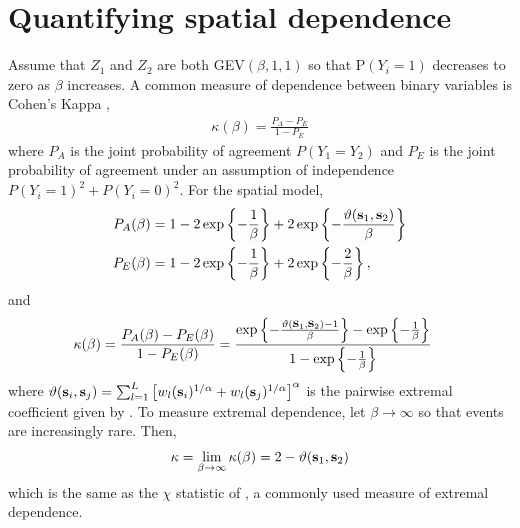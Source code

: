 \documentclass[11pt]{article}
\begin{document}

\section{Quantifying spatial dependence} \label{rbs:spatdep}
Assume that $Z_1$ and $Z_2$ are both GEV$(\beta, 1, 1)$ so that P$(Y_i = 1)$ decreases to zero as $\beta$ increases.
A common measure of dependence between binary variables is Cohen's Kappa \citep{Cohen1960},
\begin{align}
  \kappa(\beta) = \frac{P_A - P_E}{1 - P_E}
\end{align}
where $P_A$ is the joint probability of agreement $P(Y_1 = Y_2)$ and $P_E$ is the joint probability of agreement under an assumption of independence $P(Y_i = 1)^2 + P(Y_i = 0)^2$.
For the spatial model,
\begin{align*}
  P_A(\beta) &= 1 - 2 \exp\left\{ -\frac{1}{\beta} \right\} + 2 \exp\left\{-\frac{\vartheta(\mbox{\bf s}_1, \mbox{\bf s}_2)}{\beta}  \right\} \nonumber \\
  P_E(\beta) &= 1 - 2 \exp \left\{ -\frac{1}{\beta} \right\} + 2 \exp \left\{ -\frac{2}{\beta} \right\}, \nonumber
\end{align*}
and
\begin{align} \label{rbeq:kappa}
  \kappa(\beta) &= \frac{P_A(\beta) - P_E(\beta)}{1 - P_E(\beta)} = \frac{\exp\left\{-\frac{\vartheta(\mbox{\bf s}_1, \mbox{\bf s}_2) - 1}{\beta}  \right\} - \exp \left\{ -\frac{1}{\beta} \right\}}{1 - \exp \left\{ -\frac{1}{\beta} \right\}}
\end{align}
where $\vartheta (\mbox{\bf s}_i, \mbox{\bf s}_j) = \sum_{ l = 1 }^{ L } \left[ w_{l}(\mbox{\bf s}_i)^{ 1/\alpha } +  w_{ l}(\mbox{\bf s}_j)^{ 1/\alpha } \right]^\alpha$ is the pairwise extremal coefficient given by \citet{Reich2012}.
To measure extremal dependence, let $\beta \rightarrow \infty$ so that events are increasingly rare.
Then,
\begin{align}
  \kappa = \lim_{\beta \rightarrow \infty} \kappa(\beta) = 2 - \vartheta(\mbox{\bf s}_1, \mbox{\bf s}_2)
\end{align}
which is the same as the $\chi$ statistic of \citet{Coles2001}, a commonly used measure of extremal dependence.
\end{document}
